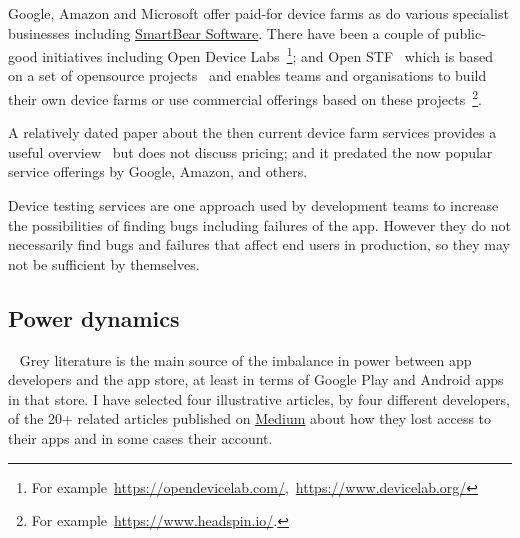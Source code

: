 Google, Amazon and Microsoft offer paid-for device farms as do various specialist businesses including \href{https://support.smartbear.com/bitbar/docs/about-bitbar.html}{SmartBear Software}. There have been a couple of public-good initiatives including Open Device Labs~\footnote{For example~\url{https://opendevicelab.com/},~\url{https://www.devicelab.org/}}; and Open STF~ which is based on a set of opensource projects~ and enables teams and organisations to build their own device farms or use commercial offerings based on these projects~\footnote{For example~\url{https://www.headspin.io/}.}.

A relatively dated paper about the then current device farm services provides a useful overview~ but does not discuss pricing; and it predated the now popular service offerings by Google, Amazon, and others. 

Device testing services are one approach used by development teams to increase the possibilities of finding bugs including failures of the app. However they do not necessarily find bugs and failures that affect end users in production, so they may not be sufficient by themselves.


\subsection{Power dynamics}~\label{rw-power-dynamics-topic}
Grey literature is the main source of the imbalance in power between app developers and the app store, at least in terms of Google Play and Android apps in that store. I have selected four illustrative articles, by four different developers, of the 20+ related articles published on \href{https://medium.com/}{Medium} %
about how they lost access to their apps and in some cases their account. 

